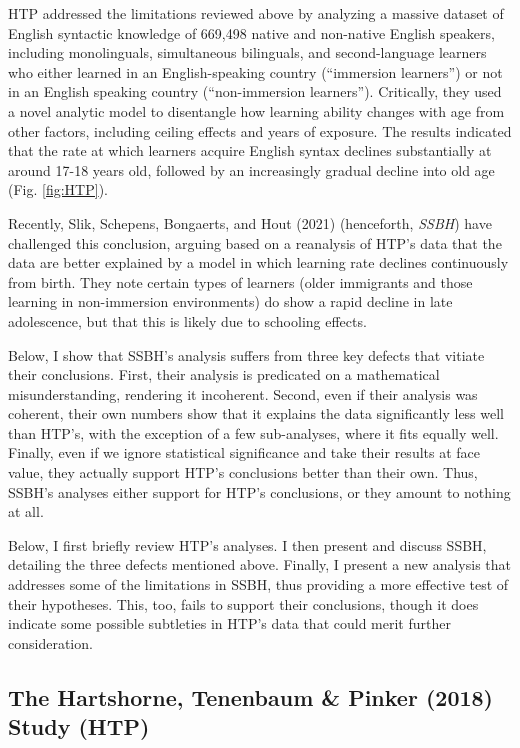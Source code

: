 \documentclass[
  english,
  doc,floatsintext]{apa6}
\begin{document}
HTP addressed the limitations reviewed above by analyzing a massive dataset of English syntactic knowledge of 669,498 native and non-native English speakers, including monolinguals, simultaneous bilinguals, and second-language learners who either learned in an English-speaking country (``immersion learners'') or not in an English speaking country (``non-immersion learners''). Critically, they used a novel analytic model to disentangle how learning ability changes with age from other factors, including ceiling effects and years of exposure. The results indicated that the rate at which learners acquire English syntax declines substantially at around 17-18 years old, followed by an increasingly gradual decline into old age (Fig. \ref{fig:HTP}).

Recently, Slik, Schepens, Bongaerts, and Hout (2021) (henceforth, \emph{SSBH}) have challenged this conclusion, arguing based on a reanalysis of HTP's data that the data are better explained by a model in which learning rate declines continuously from birth. They note certain types of learners (older immigrants and those learning in non-immersion environments) do show a rapid decline in late adolescence, but that this is likely due to schooling effects.

Below, I show that SSBH's analysis suffers from three key defects that vitiate their conclusions. First, their analysis is predicated on a mathematical misunderstanding, rendering it incoherent. Second, even if their analysis was coherent, their own numbers show that it explains the data significantly less well than HTP's, with the exception of a few sub-analyses, where it fits equally well. Finally, even if we ignore statistical significance and take their results at face value, they actually support HTP's conclusions better than their own. Thus, SSBH's analyses either support for HTP's conclusions, or they amount to nothing at all.

Below, I first briefly review HTP's analyses. I then present and discuss SSBH, detailing the three defects mentioned above. Finally, I present a new analysis that addresses some of the limitations in SSBH, thus providing a more effective test of their hypotheses. This, too, fails to support their conclusions, though it does indicate some possible subtleties in HTP's data that could merit further consideration.

\hypertarget{the-hartshorne-tenenbaum-pinker-2018-study-htp}{%
\subsection{The Hartshorne, Tenenbaum \& Pinker (2018) Study (HTP)}\label{the-hartshorne-tenenbaum-pinker-2018-study-htp}}
\end{document}
